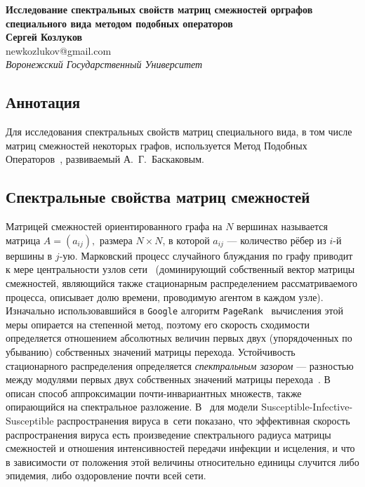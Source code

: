 \documentclass[12pt]{article}
\begin{document}

\begin{center}
    \textbf{Исследование спектральных свойств матриц
смежностей орграфов специального вида
методом подобных операторов}\\[3mm]
    \textbf{Сергей Козлуков}\\
    newkozlukov@gmail.com\\[2mm]
    \emph{Воронежский Государственный Университет}\\[2mm]
\end{center}

\subsection*{Аннотация}
Для исследования спектральных свойств матриц специального вида,
в том числе матриц смежностей некоторых графов,
используется Метод Подобных Операторов~\cite{baskakov-harmonic,baskakov1983},
развиваемый А.~Г.~Баскаковым.

\subsection*{Спектральные свойства матриц смежностей}
Матрицей смежностей ориентированного графа на \( N \) вершинах
    называется матрица \( A=(a_{ij}), \)
    размера \( N\times N \),
    в которой \( a_{ij} \) --- количество рёбер
    из \( i \)-й вершины в \( j \)-ую.
Марковский процесс случайного блуждания по графу
    приводит к мере центральности
    узлов сети~\cite{bonacich1972factoring}
    (доминирующий собственный вектор матрицы смежностей,
     являющийся также стационарным распределением
     рассматриваемого процесса,
     описывает долю времени, проводимую агентом в каждом узле).
Изначально использовавшийся в \texttt{Google}
    алгоритм \texttt{PageRank}~\cite{ilprints422}
    вычисления этой меры опирается на степенной метод,
    поэтому его скорость сходимости
    определяется отношением абсолютных величин
    первых двух (упорядоченных по убыванию)
    собственных значений матрицы перехода.
Устойчивость стационарного распределения
    определяется \emph{спектральным зазором}
    --- разностью между модулями первых двух
    собственных значений матрицы перехода~\cite{meyer1994sensitivity}.
В~\cite{schwartz2006fluctuation} описан способ
    аппроксимации почти-инвариантных множеств,
    также опирающийся на спектральное разложение.
В~\cite{chakrabarti2008epidemic,wang2003epidemic}
    для модели Susceptible-Infective-Susceptible
    распространения вируса в~сети
    показано, что эффективная скорость
    распространения вируса есть произведение
    спектрального радиуса матрицы смежностей
    и отношения интенсивностей передачи инфекции и исцеления,
    и что в зависимости от положения этой величины относительно единицы
    случится либо эпидемия, либо оздоровление почти всей сети.
\end{document}

